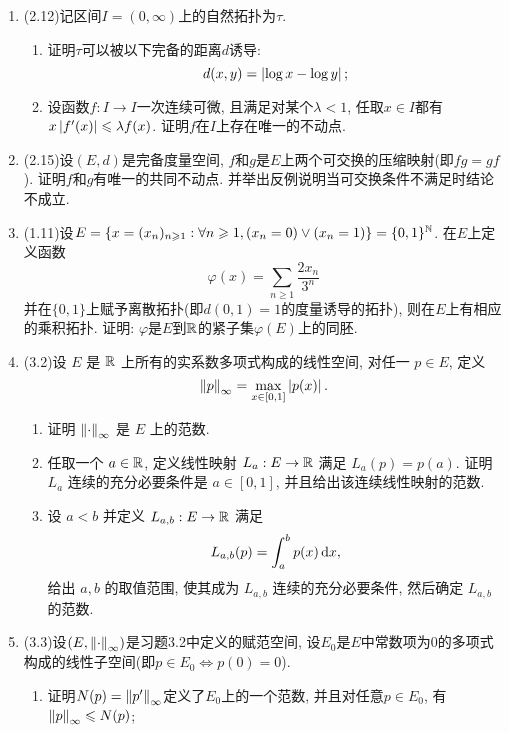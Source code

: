 \begin{enumerate}[label=\textbf{\arabic*.}, ref=\arabic*]
    \item (2.12)记区间$ I=(0,\infty) $上的自然拓扑为$ \tau $.
    \begin{enumerate}[(1)]
        \item 证明$ \tau $可以被以下完备的距离$ d $诱导:
            \[
            d(x,y)=\left| \log x-\log y \right| ;
            \]
        \item 设函数$ f : I\to I $一次连续可微, 且满足对某个$ \lambda<1 $, 任取$ x\in I $都有$ x\left| f'(x) \right| \leqslant\lambda f(x) $. 证明$ f $在$ I $上存在唯一的不动点.
    \end{enumerate}
    \item (2.15)设$ (E,d) $是完备度量空间, $ f $和$ g $是$ E $上两个可交换的压缩映射(即$ fg=gf $). 证明$ f $和$ g $有唯一的共同不动点. 并举出反例说明当可交换条件不满足时结论不成立.
    \item (1.11)设$ E=\{ x=(x_n)_{n\geqslant 1} : \forall n\geqslant 1, (x_n=0)\lor(x_n=1) \}=\{ 0,1 \}^{\mathbb{N}} $. 在$ E $上定义函数
        \[
        \varphi(x)=\sum_{n\geqslant 1}\frac{2x_n}{3^{n  }}
        \]
        并在$ \{ 0,1 \} $上赋予离散拓扑(即$ d(0,1)=1 $的度量诱导的拓扑), 则在$ E $上有相应的乘积拓扑. 证明: $ \varphi $是$ E $到$ \mathbb{R} $的紧子集$ \varphi(E) $上的同胚.
    \item (3.2)设 $ E $ 是 $ \mathbb{R} $ 上所有的实系数多项式构成的线性空间, 对任一 $ p\in E $, 定义
        \[
            \left\| p \right\|_{\infty}=\max_{x\in[0, 1]}\left| p(x) \right| .
        \]
        \begin{enumerate}[(1)]
            \item 证明 $ \left\| \cdot \right\|_{\infty} $ 是 $ E $ 上的范数.
            \item 任取一个 $ a\in\mathbb{R} $, 定义线性映射 $ L_{a}:E\to \mathbb{R} $ 满足 $ L_{a}(p)=p(a) $. 证明 $ L_{a} $ 连续的充分必要条件是 $ a\in[0, 1] $, 并且给出该连续线性映射的范数.
            \item 设 $ a<b $ 并定义 $ L_{a, b}:E\to \mathbb{R} $ 满足
            \[
                L_{a, b}(p)=\int_{a}^{b}p(x)\,\mathrm{d} x,
            \]
            给出 $ a, b $ 的取值范围, 使其成为 $ L_{a, b} $ 连续的充分必要条件, 然后确定 $ L_{a, b} $ 的范数.
        \end{enumerate}
    \item (3.3)设$ (E,\left\| \cdot \right\|_\infty) $是习题3.2中定义的赋范空间, 设$ E_0 $是$ E $中常数项为0的多项式构成的线性子空间(即$ p\in E_0\Longleftrightarrow p(0)=0 $).
        \begin{enumerate}[(1)]
        \item 证明$ N(p)=\left\| p' \right\|_\infty $定义了$ E_0 $上的一个范数, 并且对任意$ p\in E_0 $, 有$ \left\| p \right\|_\infty\leqslant N(p) $;

\end{enumerate}
\end{enumerate}
